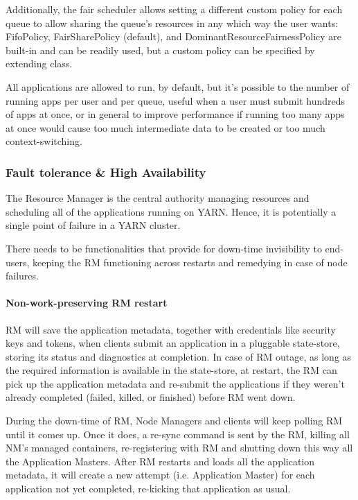 Additionally, the fair scheduler allows setting a different custom policy for each queue to allow sharing the queue’s resources in any which way the user wants: FifoPolicy, FairSharePolicy (default), and DominantResourceFairnessPolicy are built-in and can be readily used, but a custom policy can be specified by extending \texttt{} class. 

All applications are allowed to run, by default, but it's possible to the number of running apps per user and per queue, useful when a user must submit hundreds of apps at once, or in general to improve performance if running too many apps at once would cause too much intermediate data to be created or too much context-switching.

\subsubsection{Fault tolerance \& High Availability}

The Resource Manager is the central authority managing resources and scheduling all of the applications running on YARN. Hence, it is potentially a single point of failure in a YARN cluster. 

There needs to be functionalities that provide for down-time invisibility to end-users, keeping the RM functioning across restarts and remedying in case of node failures.

\paragraph{Non-work-preserving RM restart} RM will save the application metadata, together with credentials like security keys and tokens, when clients submit an application in a pluggable state-store, storing its status and diagnostics at completion. In case of RM outage, as long as the required information is available in the state-store, at restart, the RM can pick up the application metadata and re-submit the applications if they weren't already completed (failed, killed, or finished) before RM went down.

During the down-time of RM, Node Managers and clients will keep polling RM until it comes up. Once it does, a re-sync command is sent by the RM, killing all NM's managed containers, re-registering with RM and shutting down this way all the Application Masters. After RM restarts and loads all the application metadata, it will create a new attempt (i.e. Application Master) for each application not yet completed, re-kicking that application as usual.

